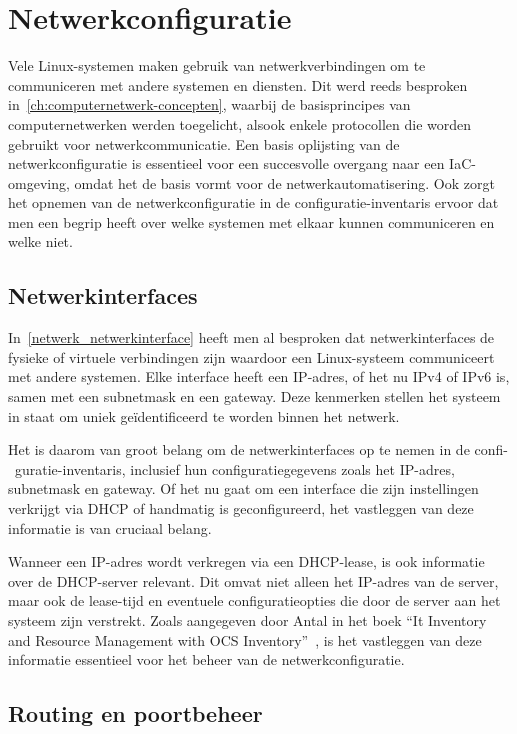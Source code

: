 \section{Netwerkconfiguratie}
\label{risico_netwerkconfiguratie}

Vele Linux-systemen maken gebruik van netwerkverbindingen om te communiceren met andere systemen en diensten.
Dit werd reeds besproken in~\ref{ch:computernetwerk-concepten}, waarbij de basisprincipes van computernetwerken werden toegelicht, alsook enkele protocollen die worden gebruikt voor netwerkcommunicatie.
Een basis oplijsting van de netwerkconfiguratie is essentieel voor een succesvolle overgang naar een IaC-omgeving, omdat het de basis vormt voor de netwerkautomatisering.
Ook zorgt het opnemen van de netwerkconfiguratie in de configuratie-inventaris ervoor dat men een begrip heeft over welke systemen met elkaar kunnen communiceren en welke niet.

\subsection{Netwerkinterfaces}
\label{risico_netwerkinterfaces}

In~\ref{netwerk_netwerkinterface} heeft men al besproken dat netwerkinterfaces de fysieke of virtuele verbindingen zijn waardoor een Linux-systeem communiceert met andere systemen.
Elke interface heeft een IP-adres, of het nu IPv4 of IPv6 is, samen met een subnetmask en een gateway.
Deze kenmerken stellen het systeem in staat om uniek ge\"identificeerd te worden binnen het netwerk.

Het is daarom van groot belang om de netwerkinterfaces op te nemen in de confi-\ guratie-inventaris, inclusief hun configuratiegegevens zoals het IP-adres, subnetmask en gateway.
Of het nu gaat om een interface die zijn instellingen verkrijgt via DHCP of handmatig is geconfigureerd, het vastleggen van deze informatie is van cruciaal belang.

Wanneer een IP-adres wordt verkregen via een DHCP-lease, is ook informatie over de DHCP-server relevant.
Dit omvat niet alleen het IP-adres van de server, maar ook de lease-tijd en eventuele configuratieopties die door de server aan het systeem zijn verstrekt.
Zoals aangegeven door Antal in het boek ``It Inventory and Resource Management with OCS Inventory''~\autocite{Antal2010}, is het vastleggen van deze informatie essentieel voor het beheer van de netwerkconfiguratie.

\subsection{Routing en poortbeheer}
\label{risico_routing_poorten}

